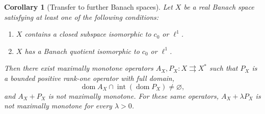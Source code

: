 \documentclass[11pt]{article}
\newcommand{\dom}{\operatorname{dom}}
\newtheorem{corollary}{Corollary}
\theoremstyle{definition}
\theoremstyle{remark}
\begin{document}
\begin{corollary}[Transfer to further Banach spaces]
\label{cor:space-transfer}
Let $X$ be a real Banach space satisfying at least one of the following conditions:
\begin{enumerate}
\item $X$ contains a closed subspace isomorphic to $c_0$ or $\ell^1$.
\item $X$ has a Banach quotient isomorphic to $c_0$ or $\ell^1$.
\end{enumerate}
Then there exist maximally monotone operators $A_X,P_X:X\rightrightarrows X^*$ such that $P_X$ is a bounded positive rank-one operator with full domain,
\[
\dom A_X\cap\operatorname{int}(\dom P_X)\ne\varnothing,
\]
and $A_X+P_X$ is not maximally monotone.
For these same operators, $A_X+\lambda P_X$ is not maximally monotone for every $\lambda>0$.
\end{corollary}
\end{document}
